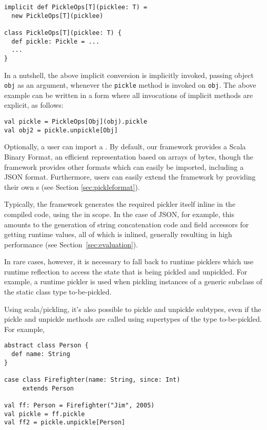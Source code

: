 \begin{lstlisting}
implicit def PickleOps[T](picklee: T) =
  new PickleOps[T](picklee)

class PickleOps[T](picklee: T) {
  def pickle: Pickle = ...
  ...
}
\end{lstlisting}

In a nutshell, the above implicit conversion is implicitly invoked, passing
object \verb|obj| as an argument, whenever the \verb|pickle| method is invoked
on \verb|obj|. The above example can be written in a form where all
invocations of implicit methods are explicit, as follows:

\begin{lstlisting}
val pickle = PickleOps[Obj](obj).pickle
val obj2 = pickle.unpickle[Obj]
\end{lstlisting}


Optionally, a user can
import a . By default, our framework provides a
Scala Binary Format, an efficient representation based on arrays of bytes,
though the framework provides other formats which can easily be imported,
including a JSON format. Furthermore, users can easily extend the framework by
providing their own s (see Section \ref{sec:pickleformat}).

Typically, the framework generates the required pickler itself inline in the
compiled code, using the  in scope. In the case of JSON,
for example, this amounts to the generation of string concatenation code and
field accessors for getting runtime values, all of which is inlined, generally resulting
in high performance (see Section~\ref{sec:evaluation}).

In rare cases, however, it is necessary to fall back to runtime picklers which
use runtime reflection to access the state that is being pickled and
unpickled. For example, a runtime pickler is used when pickling instances of a
generic subclass of the static class type to-be-pickled.

Using scala/pickling, it's
also possible to pickle and unpickle subtypes, even if the pickle and unpickle
methods are called using supertypes of the type to-be-pickled.
For example,

\begin{lstlisting}
abstract class Person {
  def name: String
}

case class Firefighter(name: String, since: Int)
     extends Person

val ff: Person = Firefighter("Jim", 2005)
val pickle = ff.pickle
val ff2 = pickle.unpickle[Person]
\end{lstlisting}

